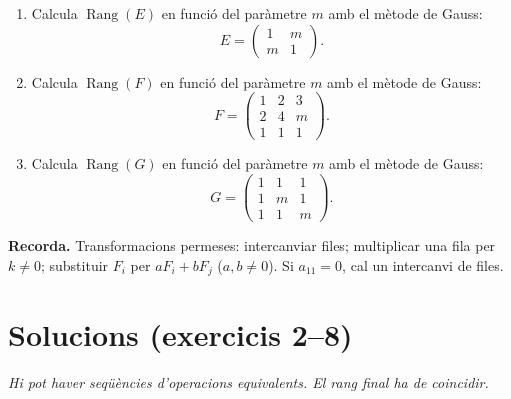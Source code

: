\documentclass[12pt,a4paper]{article}
\newcommand{\blocInici}{%
  \par\nobreak\vspace{0pt}%
  \begin{minipage}[t]{\linewidth}%
}
\newcommand{\blocFi}{%
  \end{minipage}%
  \par
}
\begin{document}
\begin{enumerate}[leftmargin=*,itemsep=0.55em,parsep=0.2em]
\item
{}%
\blocInici
Calcula $\operatorname{Rang}(E)$ en funció del paràmetre $m$ amb el mètode de Gauss:
\[
  E = \begin{pmatrix}
    1 & m \\
    m & 1
  \end{pmatrix}.
\]
\blocFi

\item
{}%
\blocInici
Calcula $\operatorname{Rang}(F)$ en funció del paràmetre $m$ amb el mètode de Gauss:
\[
  F = \begin{pmatrix}
    1 & 2 & 3 \\
    2 & 4 & m \\
    1 & 1 & 1
  \end{pmatrix}.
\]
\blocFi

\item
{}%
\blocInici
Calcula $\operatorname{Rang}(G)$ en funció del paràmetre $m$ amb el mètode de Gauss:
\[
  G = \begin{pmatrix}
    1 & 1 & 1 \\
    1 & m & 1 \\
    1 & 1 & m
  \end{pmatrix}.
\]
\blocFi

\end{enumerate}

\vspace{0.4em}
\begin{tcolorbox}[
  colback=white,
  colframe=margueVerdClar,
  boxrule=0.7pt,
  arc=2pt,
  left=5pt, right=5pt, top=3pt, bottom=3pt,
  fontupper=\small
]
\textbf{Recorda.}
Transformacions permeses:
intercanviar files;
multiplicar una fila per $k \neq 0$;
substituir $F_i$ per $a F_i + b F_j$ ($a,b \neq 0$).
Si $a_{11}=0$, cal un intercanvi de files.
\end{tcolorbox}

\newpage
\section*{Solucions (exercicis 2--8)}
{\small\textit{Hi pot haver seqüències d'operacions equivalents.
El rang final ha de coincidir.}}

\vspace{0.35em}
\footnotesize
\end{document}
